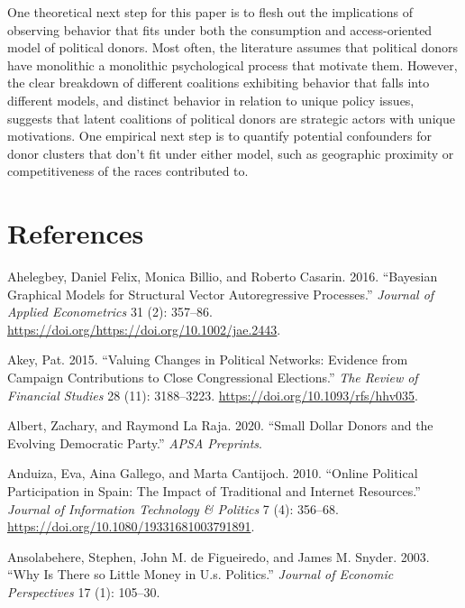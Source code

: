 \documentclass[12pt,]{article}
\begin{document}
One theoretical next step for this paper is to flesh out the
implications of observing behavior that fits under both the consumption
and access-oriented model of political donors. Most often, the
literature assumes that political donors have monolithic a monolithic
psychological process that motivate them. However, the clear breakdown
of different coalitions exhibiting behavior that falls into different
models, and distinct behavior in relation to unique policy issues,
suggests that latent coalitions of political donors are strategic actors
with unique motivations. One empirical next step is to quantify
potential confounders for donor clusters that don't fit under either
model, such as geographic proximity or competitiveness of the races
contributed to.

\hypertarget{references}{%
\section*{References}\label{references}}

\hypertarget{refs}{}
\leavevmode\hypertarget{ref-bic}{}%
Ahelegbey, Daniel Felix, Monica Billio, and Roberto Casarin. 2016.
``Bayesian Graphical Models for Structural Vector Autoregressive
Processes.'' \emph{Journal of Applied Econometrics} 31 (2): 357--86.
\url{https://doi.org/https://doi.org/10.1002/jae.2443}.

\leavevmode\hypertarget{ref-akey2015}{}%
Akey, Pat. 2015. ``Valuing Changes in Political Networks: Evidence from
Campaign Contributions to Close Congressional Elections.'' \emph{The
Review of Financial Studies} 28 (11): 3188--3223.
\url{https://doi.org/10.1093/rfs/hhv035}.

\leavevmode\hypertarget{ref-albert2020}{}%
Albert, Zachary, and Raymond La Raja. 2020. ``Small Dollar Donors and
the Evolving Democratic Party.'' \emph{APSA Preprints}.

\leavevmode\hypertarget{ref-anduiza2010}{}%
Anduiza, Eva, Aina Gallego, and Marta Cantijoch. 2010. ``Online
Political Participation in Spain: The Impact of Traditional and Internet
Resources.'' \emph{Journal of Information Technology \& Politics} 7 (4):
356--68. \url{https://doi.org/10.1080/19331681003791891}.

\leavevmode\hypertarget{ref-ansolabehere2003}{}%
Ansolabehere, Stephen, John M. de Figueiredo, and James M. Snyder. 2003.
``Why Is There so Little Money in U.s. Politics.'' \emph{Journal of
Economic Perspectives} 17 (1): 105--30.
\end{document}
